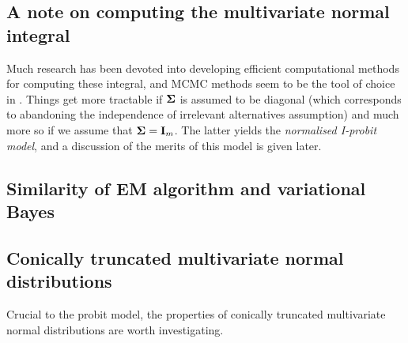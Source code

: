 \subsection{A note on computing the multivariate normal integral}
\label{misc:mnint}


Much research has been devoted into developing efficient computational methods for computing these integral, and MCMC methods seem to be the tool of choice in \citep{mcculloch1994exact,nobile1998hybrid,mcculloch2000bayesian}.
Things get more tractable if ${\bm\Sigma}$ is assumed to be diagonal (which corresponds to abandoning the independence of irrelevant alternatives assumption) and much more so if we assume that ${\bm\Sigma} = {\mathbf I}_m$.
The latter yields the \emph{normalised I-probit model}, and a discussion of the merits of this model is given later.




\subsection{Similarity of EM algorithm and variational Bayes}

\subsection{Conically truncated multivariate normal distributions}

Crucial to the probit model, the properties of conically truncated multivariate normal distributions are worth investigating.

